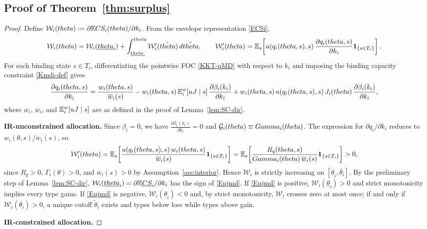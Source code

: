 \documentclass[master.tex]{subfiles}
\begin{document}
\subsection{Proof of Theorem~\ref{thm:surplus}}
\begin{proof}
Define $\mathcal W_i(theta) := \partial \mathbb{E} CS_i(theta)/\partial k_i$. From the envelope representation \eqref{ECSi},
\[\mathcal W_i(theta) = \mathcal W_i(\underline{theta}_i) + \int_{\underline{theta}_i}^{theta}\mathcal W_i'(\tilde{theta})\,d\tilde{theta}, \qquad \mathcal W_i'(theta) = \mathbb{E}_s\!\left[u\!\left(q_i(theta,s),s\right)\frac{\partial q_i(theta,s)}{\partial k_i}\mathbf 1_{\{s\in T_i\}}\right].\]
For each binding state $s\in T_i$, differentiating the pointwise FOC \eqref{KKT-qMD} with respect to $k_i$ and imposing the binding capacity constraint \eqref{Kmdi-def} gives
\[\frac{\partial q_i(theta,s)}{\partial k_i} = \frac{w_i(theta,s)}{\overline w_i(s)} - w_i(theta,s)\,\mathsf {\mathbb{E}}_i^w[uJ\mid s]\,\frac{\partial \beta_i(k_i)}{\partial k_i} + w_i(theta,s)\,u\!\left(q_i(theta,s),s\right)J_i(theta)\,\frac{\partial \beta_i(k_i)}{\partial k_i},\]
where $w_i$, $\overline w_i$, and $\mathbb{E}_i^w[uJ\mid s]$ are as defined in the proof of Lemma~\ref{lem:SC-dir}.


\noindent\textbf{IR-unconstrained allocation.} Since $\beta_i = 0$, we have $\frac{\partial \beta_i(k_i)}{\partial k_i} = 0$ and $\mathcal{G}_i(theta)\equiv Gamma_i(theta)$. The expression for $\partial q_i/\partial k_i$ reduces to $w_i(\theta,s)/\overline w_i(s)$, so
\[\mathcal W_i'(theta) = \mathbb{E}_s\!\left[\frac{u(q_i(theta,s),s)\,w_i(theta,s)}{\overline w_i(s)}\mathbf 1_{\{s\in T_i\}}\right] = \mathbb{E}_s\!\left[\frac{R_q(theta,s)}{Gamma_i(theta)\,\overline w_i(s)}\mathbf 1_{\{s\in T_i\}}\right] > 0,\]
since $R_q > 0$, $\Gamma_i(\theta) > 0$, and $\overline w_i(s) > 0$ by Assumption~\ref{ass:interior}. Hence $\mathcal W_i$ is strictly increasing on $[\underline\theta_i,\overline\theta_i]$. By the preliminary step of Lemma~\ref{lem:SC-dir}, $\mathcal W_i(\underline{theta}_i) = \partial \mathbb{E}\underline{CS}_i/\partial k_i$ has the sign of \eqref{Eujmd}. If \eqref{Eujmd} is positive, $\mathcal W_i(\underline\theta_i)>0$ and strict monotonicity implies every type gains. If \eqref{Eujmd} is negative, $\mathcal W_i(\underline\theta_i)<0$ and, by strict monotonicity, $\mathcal W_i$ crosses zero at most once; if and only if $\mathcal W_i(\overline\theta_i)>0$, a unique cutoff $\tilde\theta_i$ exists and types below lose while types above gain.


\noindent\textbf{IR-constrained allocation.}


\end{proof}
\end{document}
